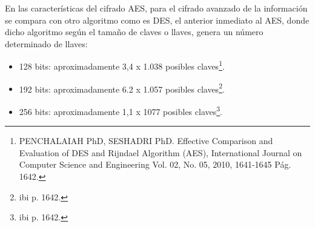 \documentclass[a4paper,openright,12pt]{book}
\theoremstyle{definition}
\theoremstyle{remark}
\begin{document}
En las características del cifrado AES, para el cifrado avanzado de la información se compara con otro algoritmo como es DES, el anterior inmediato al AES, donde dicho algoritmo según el tamaño de claves o llaves, genera un número determinado de llaves:
\begin{itemize}
	\item 128 bits: aproximadamente 3,4 x 1.038 posibles claves\footnote{PENCHALAIAH PhD, SESHADRI  PhD. Effective Comparison and Evaluation of DES and Rijndael Algorithm (AES), International Journal on Computer Science and Engineering Vol. 02, No. 05, 2010, 1641-1645 Pág. 1642.}.
    \item 192 bits: aproximadamente 6.2 x 1.057 posibles claves\footnote{ibi p. 1642.}.
    \item 256 bits: aproximadamente 1,1 x 1077 posibles claves\footnote{ibi p. 1642.}.
\end{itemize}
\end{document}
